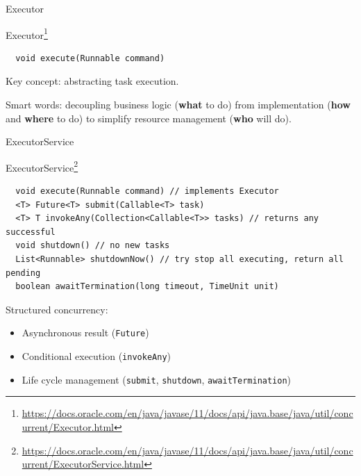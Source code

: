 \begin{frame}[fragile]{Executor}

Executor\footnote{\tiny\url{https://docs.oracle.com/en/java/javase/11/docs/api/java.base/java/util/concurrent/Executor.html}}

\begin{verbatim}
  void execute(Runnable command)
\end{verbatim}

Key concept: abstracting task execution.

Smart words: decoupling business logic (\textbf{what} to do) from implementation (\textbf{how} and \textbf{where} to do) to simplify resource management (\textbf{who} will do).

\end{frame}



\begin{frame}[fragile]{ExecutorService}

ExecutorService\footnote{\tiny\url{https://docs.oracle.com/en/java/javase/11/docs/api/java.base/java/util/concurrent/ExecutorService.html}}

\begin{verbatim}
  void execute(Runnable command) // implements Executor
  <T> Future<T> submit(Callable<T> task)   
  <T> T invokeAny(Collection<Callable<T>> tasks) // returns any successful
  void shutdown() // no new tasks
  List<Runnable> shutdownNow() // try stop all executing, return all pending
  boolean awaitTermination(long timeout, TimeUnit unit)
\end{verbatim}

Structured concurrency:
\begin{itemize}
    \item Asynchronous result (\texttt{Future})
    \item Conditional execution (\texttt{invokeAny})
    \item Life cycle management (\texttt{submit}, \texttt{shutdown}, \texttt{awaitTermination})
\end{itemize}

\end{frame}


